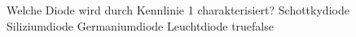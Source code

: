     {Welche Diode wird durch Kennlinie 1 charakterisiert?}
    {Schottkydiode}
    {Siliziumdiode}
    {Germaniumdiode}
    {Leuchtdiode}
    {true}{false}